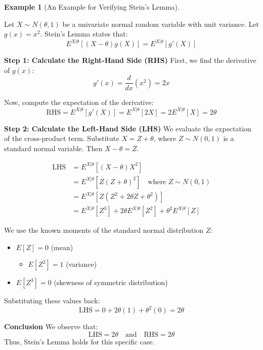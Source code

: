\documentclass[
  letterpaper,
  DIV=11,
  numbers=noendperiod]{scrreprt}
\providecommand{\tightlist}{%
  \setlength{\itemsep}{0pt}\setlength{\parskip}{0pt}}
\renewcommand{\[}{\begin{equation}}
\renewcommand{\]}{\end{equation}}
\theoremstyle{definition}
\theoremstyle{plain}
\theoremstyle{plain}
\theoremstyle{plain}
\theoremstyle{definition}
\newtheorem{example}{Example}[chapter]
\theoremstyle{plain}
\theoremstyle{remark}
\begin{document}
\begin{example}[An Example for Verifying Stein's
Lemma]\protect\hypertarget{exm-stein-polynomial}{}\label{exm-stein-polynomial}

Let \(X \sim N(\theta, 1)\) be a univariate normal random variable with
unit variance. Let \(g(x) = x^2\). Stein's Lemma states that: \[
E^{X|\theta} \left[ (X-\theta) g(X) \right] = E^{X|\theta} \left[ g'(X) \right]
\]

\textbf{Step 1: Calculate the Right-Hand Side (RHS)} First, we find the
derivative of \(g(x)\): \[
g'(x) = \frac{d}{dx} (x^2) = 2x
\]

Now, compute the expectation of the derivative: \[
\text{RHS} = E^{X|\theta} [g'(X)] = E^{X|\theta} [2X] = 2 E^{X|\theta} [X] = 2\theta
\]

\textbf{Step 2: Calculate the Left-Hand Side (LHS)} We evaluate the
expectation of the cross-product term. Substitute \(X = Z + \theta\),
where \(Z \sim N(0, 1)\) is a standard normal variable. Then
\(X - \theta = Z\).

\[
\begin{aligned}
\text{LHS} &= E^{X|\theta} \left[ (X-\theta) X^2 \right] \\
&= E^{X|\theta} \left[ Z (Z + \theta)^2 \right] \quad \text{where } Z \sim N(0,1) \\
&= E^{X|\theta} \left[ Z (Z^2 + 2\theta Z + \theta^2) \right] \\
&= E^{X|\theta} [Z^3] + 2\theta E^{X|\theta} [Z^2] + \theta^2 E^{X|\theta} [Z]
\end{aligned}
\]

We use the known moments of the standard normal distribution \(Z\):

\begin{itemize}
\tightlist
\item
  \(E[Z] = 0\) (mean)

  \begin{itemize}
  \tightlist
  \item
    \(E[Z^2] = 1\) (variance)
  \end{itemize}
\item
  \(E[Z^3] = 0\) (skewness of symmetric distribution)
\end{itemize}

Substituting these values back: \[
\text{LHS} = 0 + 2\theta(1) + \theta^2(0) = 2\theta
\]

\textbf{Conclusion} We observe that: \[
\text{LHS} = 2\theta \quad \text{and} \quad \text{RHS} = 2\theta
\] Thus, Stein's Lemma holds for this specific case.

\end{example}
\end{document}
